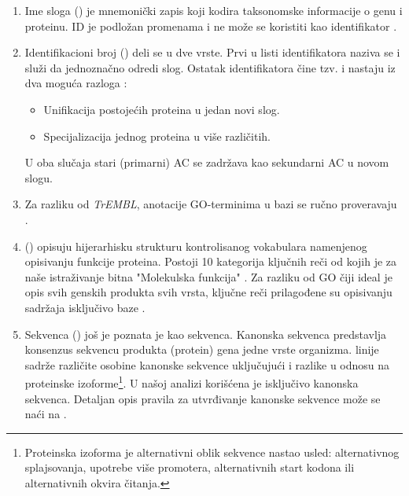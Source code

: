 \begin{enumerate}
  \item Ime sloga ()  je mnemonički zapis koji kodira
    taksonomske informacije o genu i proteinu. ID je podložan promenama 
    i ne može se koristiti kao identifikator \parencite{www_uniprot}.
  \item Identifikacioni broj ()  deli se u dve
    vrste.  Prvi u listi identifikatora naziva se  i služi da
    jednoznačno odredi slog. Ostatak identifikatora čine tzv.
     i nastaju iz dva moguća razloga \parencite{svisprot2003, www_uniprot}:
    \begin{itemize}
      \item Unifikacija postojećih proteina u jedan novi slog. 
      \item Specijalizacija jednog proteina u više različitih.
    \end{itemize}
    U oba slučaja stari (primarni) AC se zadržava kao sekundarni AC u novom slogu.

  \item Za razliku od \textit{TrEMBL}, anotacije GO-terminima u bazi \swissprot
    se ručno proveravaju \parencite{www_uniprot}.

  \item {} ()  opisuju
    hijerarhisku strukturu kontrolisanog vokabulara  namenjenog opisivanju funkcije proteina. Postoji 10 kategorija ključnih
    reči od kojih je za naše istraživanje bitna "Molekulska funkcija"
    \parencite{svisprot2003}.  Za razliku od GO čiji ideal je opis svih genskih
    produkta svih vrsta, ključne reči prilagođene su opisivanju sadržaja
    isključivo baze \swissprot \parencite{www_uniprot}.

  \item Sekvenca () još je poznata je kao 
     sekvenca. Kanonska sekvenca predstavlja konsenzus sekvencu
    produkta (protein) gena jedne vrste organizma.   linije sadrže
    različite osobine kanonske sekvence uključujući i razlike u odnosu na
    proteinske izoforme\footnote{Proteinska izoforma je alternativni oblik sekvence
    nastao usled: alternativnog splajsovanja, upotrebe više promotera,
  alternativnih start kodona ili alternativnih okvira čitanja.}.  U
  našoj analizi korišćena je isključivo kanonska sekvenca. Detaljan opis
  pravila za utvrđivanje kanonske sekvence može se naći na \cite{www_uniprot}.


\end{enumerate}
